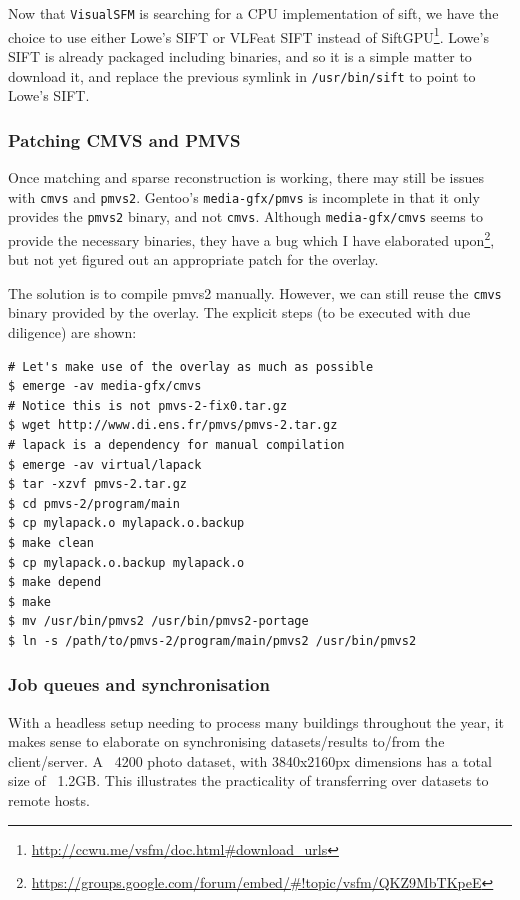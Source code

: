 Now that {\tt VisualSFM} is searching for a CPU implementation of sift, we have the choice to use either Lowe's SIFT or VLFeat SIFT instead of SiftGPU\footnote{\url{http://ccwu.me/vsfm/doc.html\#download\_urls}}. Lowe's SIFT is already packaged including binaries, and so it is a simple matter to download it, and replace the previous symlink in {\tt /usr/bin/sift} to point to Lowe's SIFT.

\subsubsection{Patching CMVS and PMVS}
Once matching and sparse reconstruction is working, there may still be issues with {\tt cmvs} and {\tt pmvs2}. Gentoo's {\tt media-gfx/pmvs} is incomplete in that it only provides the {\tt pmvs2} binary, and not {\tt cmvs}. Although {\tt media-gfx/cmvs} seems to provide the necessary binaries, they have a bug which I have elaborated upon\footnote{\url{https://groups.google.com/forum/embed/\#!topic/vsfm/QKZ9MbTKpeE}}, but not yet figured out an appropriate patch for the overlay.

The solution is to compile pmvs2 manually. However, we can still reuse the {\tt cmvs} binary provided by the overlay. The explicit steps (to be executed with due diligence) are shown:

\begin{lstlisting}
# Let's make use of the overlay as much as possible
$ emerge -av media-gfx/cmvs
# Notice this is not pmvs-2-fix0.tar.gz
$ wget http://www.di.ens.fr/pmvs/pmvs-2.tar.gz
# lapack is a dependency for manual compilation
$ emerge -av virtual/lapack
$ tar -xzvf pmvs-2.tar.gz
$ cd pmvs-2/program/main
$ cp mylapack.o mylapack.o.backup
$ make clean
$ cp mylapack.o.backup mylapack.o
$ make depend
$ make
$ mv /usr/bin/pmvs2 /usr/bin/pmvs2-portage
$ ln -s /path/to/pmvs-2/program/main/pmvs2 /usr/bin/pmvs2
\end{lstlisting}

\subsubsection{Job queues and synchronisation}

With a headless setup needing to process many buildings throughout the year, it makes sense to elaborate on synchronising datasets/results to/from the client/server. A ~4200 photo dataset, with 3840x2160px dimensions has a total size of ~1.2GB. This illustrates the practicality of transferring over datasets to remote hosts.

